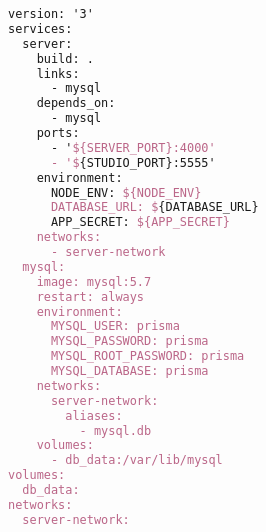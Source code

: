 \begin{lstlisting}[language=TeX, caption=Backend docker compose]
version: '3'
services:
  server:
    build: .
    links:
      - mysql
    depends_on:
      - mysql
    ports:
      - '${SERVER_PORT}:4000'
      - '${STUDIO_PORT}:5555'
    environment:
      NODE_ENV: ${NODE_ENV}
      DATABASE_URL: ${DATABASE_URL}
      APP_SECRET: ${APP_SECRET}
    networks:
      - server-network
  mysql:
    image: mysql:5.7
    restart: always
    environment:
      MYSQL_USER: prisma
      MYSQL_PASSWORD: prisma
      MYSQL_ROOT_PASSWORD: prisma
      MYSQL_DATABASE: prisma
    networks:
      server-network:
        aliases:
          - mysql.db
    volumes:
      - db_data:/var/lib/mysql
volumes: 
  db_data:
networks:
  server-network:
\end{lstlisting}

